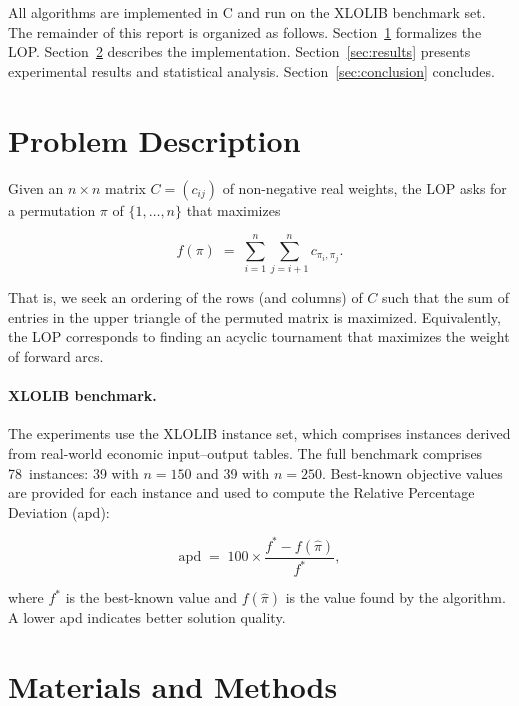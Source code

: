 \documentclass[11pt,a4paper]{article}
\begin{document}
All algorithms are implemented in C and run on the XLOLIB benchmark set.
The remainder of this report is organized as follows.
Section~\ref{sec:problem} formalizes the LOP.
Section~\ref{sec:methods} describes the implementation.
Section~\ref{sec:results} presents experimental results and statistical
analysis.
Section~\ref{sec:conclusion} concludes.

\section{Problem Description}
\label{sec:problem}

Given an $n\times n$ matrix $C=(c_{ij})$ of non-negative real weights,
the LOP asks for a permutation $\pi$ of $\{1,\ldots,n\}$ that maximizes

\begin{equation}
  f(\pi) \;=\; \sum_{i=1}^{n}\sum_{j=i+1}^{n} c_{\pi_i,\pi_j}.
  \label{eq:lop}
\end{equation}

That is, we seek an ordering of the rows (and columns) of $C$ such that
the sum of entries in the upper triangle of the permuted matrix is
maximized.  Equivalently, the LOP corresponds to finding an acyclic
tournament that maximizes the weight of forward arcs.

\paragraph{XLOLIB benchmark.}
The experiments use the XLOLIB instance set, which comprises instances
derived from real-world economic input--output tables.  The full benchmark comprises
78~instances: 39 with $n=150$ and 39 with $n=250$.  Best-known
objective values are provided for each instance and used to compute the
Relative Percentage Deviation (apd):

\begin{equation}
  \mathrm{apd} \;=\; 100 \times \frac{f^*-f(\hat\pi)}{f^*},
  \label{eq:apd}
\end{equation}

where $f^*$ is the best-known value and $f(\hat\pi)$ is the value found
by the algorithm.  A lower apd indicates better solution quality.

\section{Materials and Methods}
\label{sec:methods}
\end{document}
